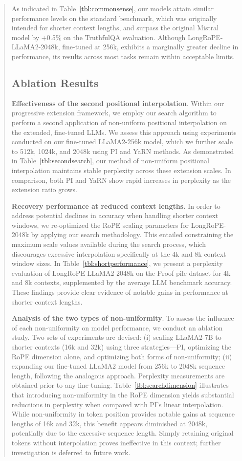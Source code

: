 \begin{abstract}
As indicated in Table~\ref{tbl:commonsense}, our models attain similar performance levels on the standard benchmark, which was originally intended for shorter context lengths, and surpass the original Mistral model by +0.5\% on the TruthfulQA evaluation. Although LongRoPE-LLaMA2-2048k, fine-tuned at 256k, exhibits a marginally greater decline in performance, its results across most tasks remain within acceptable limits.

\subsection{Ablation Results}

\textbf{Effectiveness of the second positional interpolation}. Within our progressive extension framework, we employ our search algorithm to perform a second application of non-uniform positional interpolation on the extended, fine-tuned LLMs. We assess this approach using experiments conducted on our fine-tuned LLaMA2-256k model, which we further scale to 512k, 1024k, and 2048k using PI and YaRN methods. As demonstrated in Table~\ref{tbl:secondsearch}, our method of non-uniform positional interpolation maintains stable perplexity across these extension scales. In comparison, both PI and YaRN show rapid increases in perplexity as the extension ratio grows.

\textbf{Recovery performance at reduced context lengths.} In order to address potential declines in accuracy when handling shorter context windows, we re-optimized the RoPE scaling parameters for LongRoPE-2048k by applying our search methodology. This entailed constraining the maximum scale values available during the search process, which discourages excessive interpolation specifically at the 4k and 8k context window sizes. In Table~\ref{tbl:shortperformance}, we present a perplexity evaluation of LongRoPE-LLaMA2-2048k on the Proof-pile dataset for 4k and 8k contexts, supplemented by the average LLM benchmark accuracy. These findings provide clear evidence of notable gains in performance at shorter context lengths.

\textbf{Analysis of the two types of non-uniformity}. To assess the influence of each non-uniformity on model performance, we conduct an ablation study. Two sets of experiments are devised: (i) scaling LLaMA2-7B to shorter contexts (16k and 32k) using three strategies—PI, optimizing the RoPE dimension alone, and optimizing both forms of non-uniformity; (ii) expanding our fine-tuned LLaMA2 model from 256k to 2048k sequence length, following the analogous approach. Perplexity measurements are obtained prior to any fine-tuning. Table~\ref{tbl:searchdimension} illustrates that introducing non-uniformity in the RoPE dimension yields substantial reductions in perplexity when compared with PI's linear interpolation. While non-uniformity in token position provides notable gains at sequence lengths of 16k and 32k, this benefit appears diminished at 2048k, potentially due to the excessive sequence length. Simply retaining original tokens without interpolation proves ineffective in this context; further investigation is deferred to future work.


\end{abstract}
